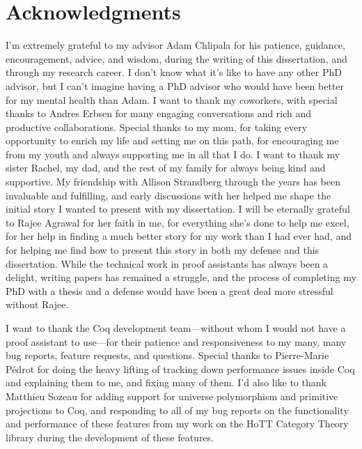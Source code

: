 \cleardoublepage

\section*{Acknowledgments}

\newcommand{\ackfirstcite}[1]{\citetitle{#1}~\cite{#1}}
\newcommand{\ackshortcite}[1]{\cite{#1}}
\newcommand{\acklongcite}[1]{\citetitle{#1}~\cite{#1}}

I'm extremely grateful to my advisor Adam Chlipala for his patience, guidance, encouragement, advice, and wisdom, during the writing of this dissertation, and through my research career.
I don't know what it's like to have any other PhD advisor, but I can't imagine having a PhD advisor who would have been better for my mental health than Adam.
I want to thank my coworkers, with special thanks to Andres Erbsen for many engaging conversations and rich and productive collaborations.
Special thanks to my mom, for taking every opportunity to enrich my life and setting me on this path, for encouraging me from my youth and always supporting me in all that I do.
I want to thank my sister Rachel, my dad, and the rest of my family for always being kind and supportive.
My friendship with Allison Strandberg through the years has been invaluable and fulfilling, and early discussions with her helped me shape the initial story I wanted to present with my dissertation.
I will be eternally grateful to Rajee Agrawal for her faith in me, for everything she's done to help me excel, for her help in finding a much better story for my work than I had ever had, and for helping me find how to present this story in both my defense and this dissertation.
While the technical work in proof assistants has always been a delight, writing papers has remained a struggle, and the process of completing my PhD with a thesis and a defense would have been a great deal more stressful without Rajee.

I want to thank the Coq development team---without whom I would not have a proof assistant to use---for their patience and responsiveness to my many, many bug reports, feature requests, and questions.
Special thanks to Pierre-Marie Pédrot for doing the heavy lifting of tracking down performance issues inside Coq and explaining them to me, and fixing many of them.
I'd also like to thank Matthieu Sozeau for adding support for universe polymorphism and primitive projections to Coq, and responding to all of my bug reports on the functionality and performance of these features from my work on the HoTT Category Theory library during the development of these features.

